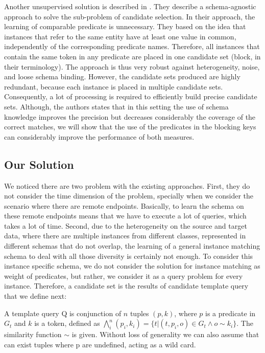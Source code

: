 Another unsupervised solution is described in \cite{DBLP:conf/wsdm/PapadakisINF11}. They describe  a schema-agnostic approach to solve the sub-problem of candidate selection. In their approach, the learning of comparable predicate is unnecessary. They based on the idea that instances that refer to the same entity have at least one value in common, independently of the corresponding predicate names. Therefore, all instances that contain the same token in any predicate are placed in one candidate set (block, in their terminology). The approach is thus very robust against heterogeneity, noise, and loose schema binding. However, the candidate sets produced are highly redundant, because each instance is placed in multiple candidate sets. Consequently, a lot of processing is required to efficiently build precise candidate sets. Although, the authors states that in this setting the use of schema knowledge improves the precision but decreases considerably the coverage of the correct matches, we will show that the use of the predicates in the blocking keys can considerably improve the performance of both measures. 

\subsection{Our Solution}

We noticed there are two problem with the existing approaches. First, they do not consider the time dimension of the problem, specially when we consider the scenario where there are remote endpoints. Basically, to learn the schema on these remote endpoints means that we have to execute a lot of queries, which takes a lot of time. Second, due to the heterogeneity on the source and target data, where there are multiple instances from different classes, represented in different schemas that do not overlap, the learning of a general instance matching schema to deal with all those diversity is certainly not enough. To consider this instance specific schema, we do not consider the solution for instance matching as weight of predicates, but rather, we consider it as a query problem for every instance. Therefore, a candidate set is the results of candidate template query that we define next:

\begin{definition}   A template query Q is conjunction of $n$ tuples $(p, k)$, where $p$ is a predicate in $G_t$ and $k$ is a token, defined as $ \bigwedge_{i}^n (p_i, k_i)=\{t | (t,p_i,o) \in G_t  \land o \sim k_i  \}$. The similarity function $\sim$ is given. Without loss of generality we can also assume that can exist tuples where p are undefined, acting as a wild card. 
\end{definition} 
 
